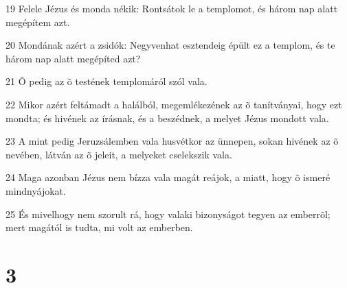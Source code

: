 \par 19 Felele Jézus és monda nékik: Rontsátok le a templomot, és három nap alatt megépítem azt.
\par 20 Mondának azért a zsidók: Negyvenhat esztendeig épült ez a templom, és te három nap alatt megépíted azt?
\par 21 Õ pedig az õ testének templomáról szól vala.
\par 22 Mikor azért feltámadt a halálból, megemlékezének az õ tanítványai, hogy ezt mondta; és hivének az írásnak, és a beszédnek, a melyet Jézus mondott vala.
\par 23 A mint pedig Jeruzsálemben vala husvétkor az ünnepen, sokan hivének az õ nevében, látván az õ jeleit, a melyeket cselekszik vala.
\par 24 Maga azonban Jézus nem bízza vala magát reájok, a miatt, hogy õ ismeré mindnyájokat.
\par 25 És mivelhogy nem szorult rá, hogy valaki bizonyságot tegyen az emberrõl; mert magától is tudta, mi volt az emberben.

\chapter{3}

